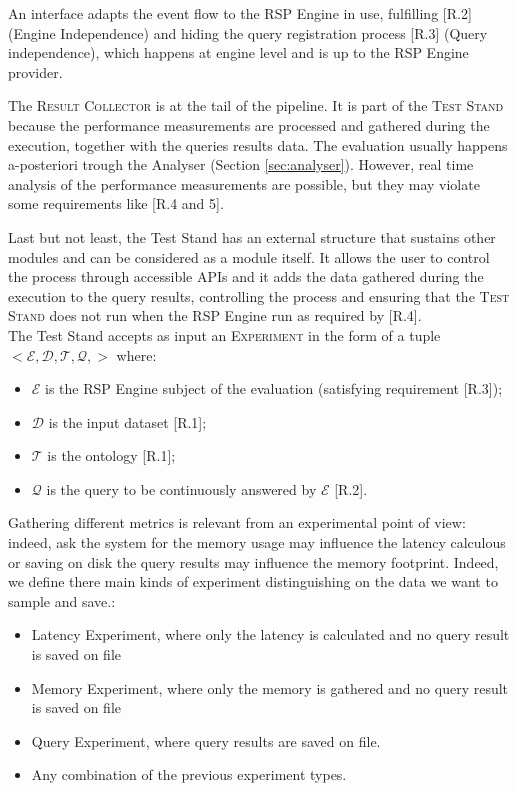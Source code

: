 An interface adapts the event flow to the RSP Engine in use, fulfilling [R.2] (Engine Independence) and hiding the query registration process [R.3] (Query independence), which happens at engine level and is up to the RSP Engine provider.

The \textsc{Result Collector} is at the tail of the pipeline. It is part of the \textsc{Test Stand} because the performance measurements are processed and gathered during the execution, together with the queries results data.  The evaluation usually happens a-posteriori trough the Analyser (Section \ref{sec:analyser}). However, real time analysis of the performance measurements are possible, but they may violate some requirements like [R.4 and 5]. 

Last but not least, the Test Stand has an external structure that sustains other modules and can be considered as a module itself. It allows the user to control the process through accessible APIs and it adds the data gathered during the execution to the query results, controlling the process and ensuring that the \textsc{Test Stand} does not run when the RSP Engine run  as required by [R.4]. \\

\noindent The Test Stand accepts as input an \textsc{Experiment} in the form of a tuple $<\mathcal{E},\mathcal{D},\mathcal{T},\mathcal{Q},>$ where:
\begin{itemize}
\item $\mathcal{E}$ is the RSP Engine subject of the evaluation (satisfying requirement [R.3]); 
\item $\mathcal{D}$ is the input dataset [R.1]; 
\item $\mathcal{T}$ is the ontology [R.1]; 
\item $\mathcal{Q}$ is the query to be continuously answered by $\mathcal{E}$ [R.2]. 
\end{itemize}

Gathering different metrics is relevant from an experimental point of view: indeed, ask the system for the memory usage may influence the latency calculous or saving on disk the query results may influence the memory footprint. Indeed, we define there main kinds of experiment distinguishing on the data we want to sample and save.:
\begin{itemize}
\item Latency Experiment, where only the latency is calculated and no query result is saved on file
\item Memory Experiment, where only the memory is gathered and no query result is saved on file
\item Query Experiment, where query results are saved on file.
\item Any combination of the previous experiment types.
\end{itemize}

